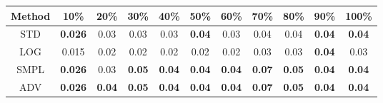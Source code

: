 \documentclass{standalone}
\begin{document}
\begin{tabular}{c|cccccccccc}
      \toprule
      Method & 10\% & 20\% & 30\% & 40\% & 50\% & 60\% & 70\% & 80\% & 90\% & 100\% \\
      \midrule
STD & \textbf{0.026} & 0.03 & 0.03 & 0.03 & \textbf{0.04} & 0.03 & 0.04 & 0.04 & \textbf{0.04} & \textbf{0.04}\\
LOG & 0.015 & 0.02 & 0.02 & 0.02 & 0.02 & 0.02 & 0.03 & 0.03 & \textbf{0.04} & 0.03\\
SMPL & \textbf{0.026} & 0.03 & \textbf{0.05} & \textbf{0.04} & \textbf{0.04} & \textbf{0.04} & \textbf{0.07} & \textbf{0.05} & \textbf{0.04} & \textbf{0.04}\\
ADV & \textbf{0.026} & \textbf{0.04} & \textbf{0.05} & \textbf{0.04} & \textbf{0.04} & \textbf{0.04} & \textbf{0.07} & \textbf{0.05} & \textbf{0.04} & \textbf{0.04}\\
  \bottomrule
\end{tabular}
\end{document}
